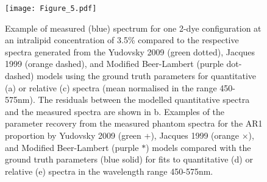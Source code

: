 \begin{figure}[htbp]
    \centering
    \texttt{[image: Figure\_5.pdf]}
    \caption{Example of measured (\textcolor{MyBlue}{blue}) spectrum for one 2-dye configuration at an intralipid concentration of 3.5\% compared to the respective spectra generated from the Yudovsky 2009 (\textcolor{MyGreen}{green dotted}), Jacques 1999 (\textcolor{MyOrange}{orange dashed}), and Modified Beer-Lambert (\textcolor{MyPurple}{purple dot-dashed}) models using the ground truth parameters for quantitative (a) or relative (c) spectra (mean normalised in the range 450-575nm). The residuals between the modelled quantitative spectra and the measured spectra are shown in b. Examples of the parameter recovery from the measured phantom spectra for the AR1 proportion by Yudovsky 2009 (\textcolor{MyGreen}{green +}), Jacques 1999 (\textcolor{MyOrange}{orange $\times$)}, and Modified Beer-Lambert (\textcolor{MyPurple}{purple $*$}) models compared with the ground truth parameters (\textcolor{MyBlue}{blue solid}) for fits to quantitative (d) or relative (e) spectra in the wavelength range 450-575nm.}
 \label{fig:phantomforwards}
\end{figure}

